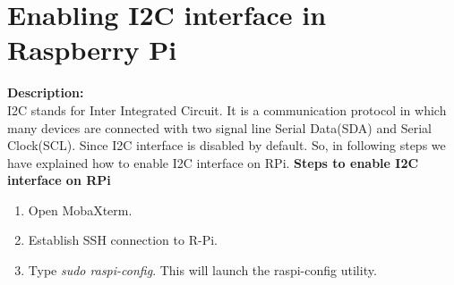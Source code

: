 \documentclass[a4paper,12pt,oneside]{book}
\begin{document}
\section{Enabling I2C interface in Raspberry Pi}
\textbf{Description:} \\
I2C stands for Inter Integrated Circuit. It is a communication protocol in which many devices are connected with two signal line Serial Data(SDA) and Serial Clock(SCL).
Since I2C interface is disabled by default. So, in following steps we have explained how to enable I2C interface on RPi. 
\textbf{Steps to enable I2C interface on RPi}
\begin{enumerate}
		\item Open MobaXterm. 
		\item Establish SSH connection to R-Pi.
		\item  Type \textit{sudo raspi-config}. This will launch the raspi-config utility.
		

\end{enumerate}
\end{document}
